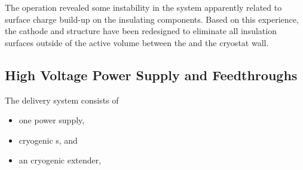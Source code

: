 

The  operation revealed some instability in the  system apparently related to surface charge build-up on the  insulating components. Based on this experience, the  cathode and  structure have been redesigned to eliminate all insulation surfaces outside of the active volume between the  and the cryostat wall.


\subsection {High Voltage Power Supply and Feedthroughs}
The  delivery system consists of
\begin{itemize}
\item one power supply,
\item {} cryogenic \fdth{}s, and
\item an  cryogenic extender, 
\end{itemize}

